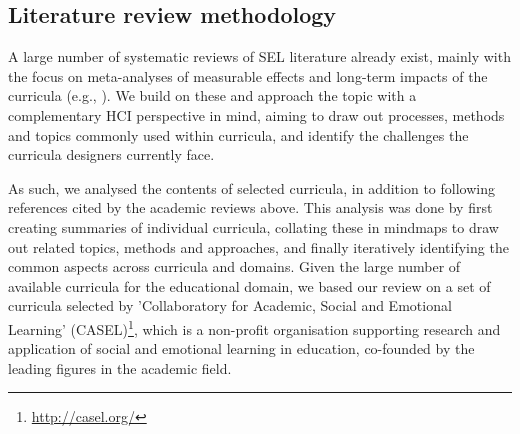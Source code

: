\documentclass[prodmode,acmtochi]{acmsmall}
\newcommand{\todo}[1]{\textrm{\textrm{\textcolor{LightBlue}{[[#1]]} } } }
\newcommand{\rephrase}[1]{\textrm{\textrm{\textcolor{gray}{#1}}}}
\begin{document}
        \fi

        
\subsection{Literature review methodology}      
\label{sec:methodology}
A large number of systematic reviews of SEL literature already exist, mainly with the focus on meta-analyses of measurable effects and long-term impacts of the curricula (e.g., \cite{Durlak2011,Weare2011,Adi2007a,Greenberg2010,Elbertson2009,Payton2008}). 
%
We build on these and approach the topic with a complementary HCI perspective in mind, aiming to draw out processes, methods and topics commonly used within curricula, and identify the challenges the curricula designers currently face. 

As such, we analysed the contents of selected curricula, in addition to following references cited by the academic reviews above. This analysis was done by first creating summaries of individual curricula, collating these in mindmaps to draw out related topics, methods and approaches, and finally iteratively identifying the common aspects across curricula and domains. 
%
Given the large number of available curricula for the educational domain, we based our review on a set of curricula selected by 'Collaboratory for Academic, Social and Emotional Learning' (CASEL)\footnote{\url{http://casel.org/}}, which is a non-profit organisation supporting research and application of social and emotional learning in education, co-founded by the leading figures in the academic field. 
\end{document}

